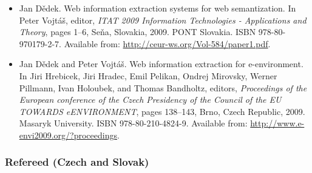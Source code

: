 \documentclass[12pt,a4paper,twoside,notitlepage]{article}
\begin{document}
\begin{itemize}
\item
Jan D{\v{e}}dek.
\newblock Web information extraction systems for web semantization.
\newblock In Peter Vojt{\'{a}}{\v{s}}, editor, {\em {ITAT} 2009 Information
  Technologies - Applications and Theory}, pages 1--6, Se{\v{n}}a, Slovakia,
  2009. {PONT} Slovakia.
\newblock ISBN 978-80-970179-2-7.
\newblock Available from: \url{http://ceur-ws.org/Vol-584/paper1.pdf}.


\item
Jan D{\v{e}}dek and Peter Vojt{\'{a}}{\v{s}}.
\newblock Web information extraction for e-environment.
\newblock In Jiri Hrebicek, Jiri Hradec, Emil Pelikan, Ondrej Mirovsky, Werner
  Pillmann, Ivan Holoubek, and Thomas Bandholtz, editors, {\em Proceedings of
  the European conference of the Czech Presidency of the Council of the {EU
  TOWARDS eENVIRONMENT}}, pages 138--143, Brno, Czech Republic, 2009. Masaryk
  University.
\newblock ISBN 978-80-210-4824-9.
\newblock Available from: \url{http://www.e-envi2009.org/?proceedings}.







\end{itemize}

\subsubsection*{Refereed (Czech and Slovak)}
\end{document}
